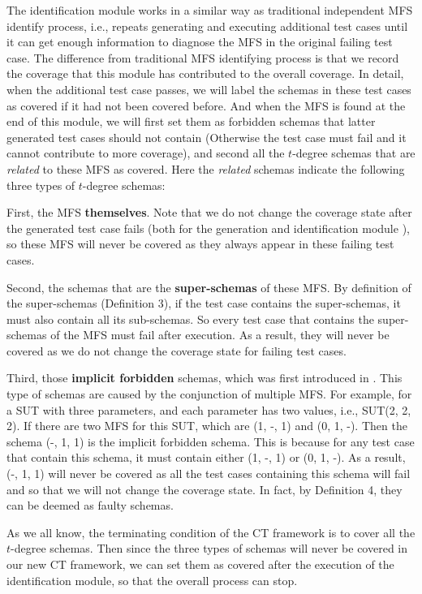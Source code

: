 \documentclass{sig-alternate}
\begin{document}
The identification module works in a similar way as traditional independent MFS identify process, i.e., repeats generating and executing additional test cases until it can get enough information to diagnose the MFS in the original failing test case. The difference from traditional MFS identifying process is that we record the coverage that this module has contributed to the overall coverage. In detail, when the additional test case passes, we will label the schemas in these test cases as covered if it had not been covered before. And when the MFS is found at the end of this module, we will first set them as forbidden schemas that latter generated test cases should not contain (Otherwise the test case must fail and it cannot contribute to more coverage), and second all the $t$-degree schemas that are \emph{related} to these MFS as covered. Here the \emph{related} schemas indicate the following three types of $t$-degree schemas:

First, the MFS \textbf{themselves}. Note that we do not change the coverage state after the generated test case fails (both for the generation and identification module ), so these MFS will never be covered as they always appear in these failing test cases.

Second, the schemas that are the \textbf{super-schemas} of these MFS. By definition of the super-schemas (Definition 3), if the test case contains the super-schemas, it must also contain all its sub-schemas. So every test case that contains the super-schemas of the MFS must fail after execution. As a result, they will never be covered as we do not change the coverage state for failing test cases.

Third, those \textbf{implicit forbidden} schemas, which was first introduced in \cite{cohen2007interaction}.  This type of schemas are caused by the conjunction of multiple MFS. For example, for a SUT with three parameters, and each parameter has two values, i.e., SUT(2, 2, 2). If there are two MFS for this SUT, which are (1, -, 1) and (0, 1, -). Then the schema (-, 1, 1) is the implicit forbidden schema. This is because for any test case that contain this schema, it must contain either (1, -, 1) or (0, 1, -). As a result, (-, 1, 1) will never be covered as all the test cases containing this schema will fail and so that we will not change the coverage state. In fact, by Definition 4, they can be deemed as faulty schemas.

As we all know, the terminating condition of the CT framework is to cover all the $t$-degree schemas. Then since the three types of schemas will never be covered in our new CT framework, we can set them as covered after the execution of the identification module, so that the overall process can stop.
\end{document}
